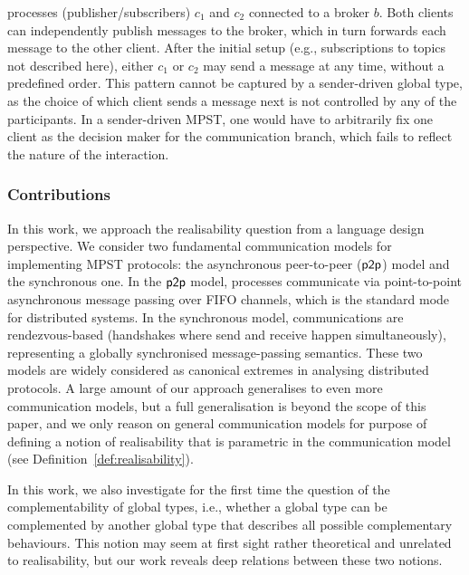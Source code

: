   processes (publisher/subscribers) $c_1$ and $c_2$ connected to a broker $b$. 
Both clients can independently publish messages to the broker, which in turn forwards each message to the other client. %
After the initial setup (e.g., subscriptions to topics not described here), either $c_1$ or $c_2$ may send a message at any time, without a predefined order. 
This pattern cannot be  captured by a sender-driven global type, as the choice of which client sends a message next is not controlled by any of the  participants.  In a sender-driven MPST, one would have to arbitrarily fix one client as the decision maker for the communication branch, which fails to reflect the  nature of the interaction.


\subsubsection*{Contributions}In this work, we approach the realisability question from a language design perspective. We consider two  fundamental communication models for implementing MPST protocols: the asynchronous peer-to-peer ($\mathsf{p2p}$) model and the synchronous one.
In the $\mathsf{p2p}$ model, processes communicate via point-to-point asynchronous message passing over FIFO channels, which is the standard mode for distributed systems.
In the synchronous model, communications are rendezvous-based (handshakes where send and receive happen simultaneously), representing a globally synchronised message-passing semantics. 
These two models are widely considered as canonical extremes in analysing distributed protocols. 
A large amount of our approach generalises to even more communication models, but a full generalisation is beyond the scope of this paper,
and we only reason on general communication models for purpose of defining a notion of realisability that is parametric in the communication model (see Definition~\ref{def:realisability}).

In this work, we also investigate for the first time the question of the complementability of global types, 
i.e., whether a global type can be complemented by another global type that describes all possible complementary behaviours.
This notion may seem at first sight rather theoretical and unrelated to realisability, but our work reveals deep relations between
these two notions.

